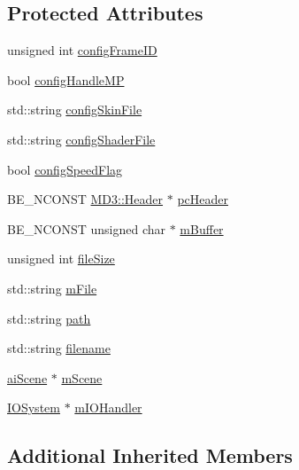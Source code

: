 \subsection*{Protected Attributes}
\begin{DoxyCompactItemize}
\item 
unsigned int \hyperlink{class_assimp_1_1_m_d3_importer_a8510742e876fd7c795ee4fd44d07d3d1}{config\+Frame\+I\+D}
\item 
bool \hyperlink{class_assimp_1_1_m_d3_importer_a439499e039067b81559efab0d04fa83a}{config\+Handle\+M\+P}
\item 
std\+::string \hyperlink{class_assimp_1_1_m_d3_importer_a0d7d627dfa48468e38e600d353ebe552}{config\+Skin\+File}
\item 
std\+::string \hyperlink{class_assimp_1_1_m_d3_importer_add356800765dd174de7fbdf0ba53e218}{config\+Shader\+File}
\item 
bool \hyperlink{class_assimp_1_1_m_d3_importer_ad0656bbdaea0d931f40194ed7e5f4b88}{config\+Speed\+Flag}
\item 
B\+E\+\_\+\+N\+C\+O\+N\+S\+T \hyperlink{struct_assimp_1_1_m_d3_1_1_header}{M\+D3\+::\+Header} $\ast$ \hyperlink{class_assimp_1_1_m_d3_importer_ad152f22b3af1dcedbc70fb818ab64d26}{pc\+Header}
\item 
B\+E\+\_\+\+N\+C\+O\+N\+S\+T unsigned char $\ast$ \hyperlink{class_assimp_1_1_m_d3_importer_abce81bd08da2cd056925f136a66740c2}{m\+Buffer}
\item 
unsigned int \hyperlink{class_assimp_1_1_m_d3_importer_a942ddee51c3a6d8027f90155119f6a7f}{file\+Size}
\item 
std\+::string \hyperlink{class_assimp_1_1_m_d3_importer_aa3b4dd1c6270f50c1ef8b729e6a7d8b1}{m\+File}
\item 
std\+::string \hyperlink{class_assimp_1_1_m_d3_importer_a12752acfc83125a3cc595aefa569e8cb}{path}
\item 
std\+::string \hyperlink{class_assimp_1_1_m_d3_importer_ae5f9670bf65c0e47bbc45d1700be7c90}{filename}
\item 
\hyperlink{structai_scene}{ai\+Scene} $\ast$ \hyperlink{class_assimp_1_1_m_d3_importer_a4d1909bdab561c4ed858d092981ada2b}{m\+Scene}
\item 
\hyperlink{class_assimp_1_1_i_o_system}{I\+O\+System} $\ast$ \hyperlink{class_assimp_1_1_m_d3_importer_ac4f4866611a3a308726823cf82cc20e1}{m\+I\+O\+Handler}
\end{DoxyCompactItemize}
\subsection*{Additional Inherited Members}


